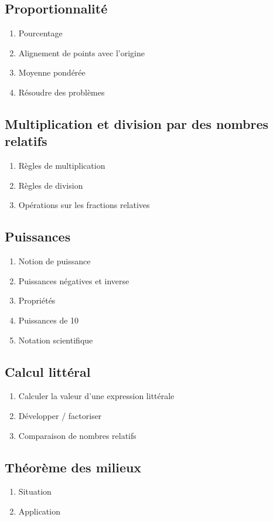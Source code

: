 \subsection{Proportionnalité}\label{ch_4_prop}

\begin{enumerate}
	\item Pourcentage
	\item Alignement de points avec l'origine
	\item Moyenne pondérée
	\item Résoudre des problèmes
\end{enumerate}

\subsection{Multiplication et division par des nombres relatifs}\label{ch_4_mul_rel}
\begin{enumerate}
	\item Règles de multiplication
	\item Règles de division
	\item Opérations sur les fractions relatives
\end{enumerate}

\subsection{Puissances}\label{ch_4_pow}
\begin{enumerate}
	\item Notion de puissance
	\item Puissances négatives et inverse
	\item Propriétés
	\item Puissances de 10
	\item Notation scientifique
\end{enumerate}

\subsection{Calcul littéral}\label{ch_4_lit}
\begin{enumerate}
	\item Calculer la valeur d'une expression littérale
	\item Développer / factoriser
	\item Comparaison de nombres relatifs
\end{enumerate}

\subsection{Théorème des milieux}\label{ch_4_mileux}
\begin{enumerate}
	\item Situation 
	\item Application
\end{enumerate}

